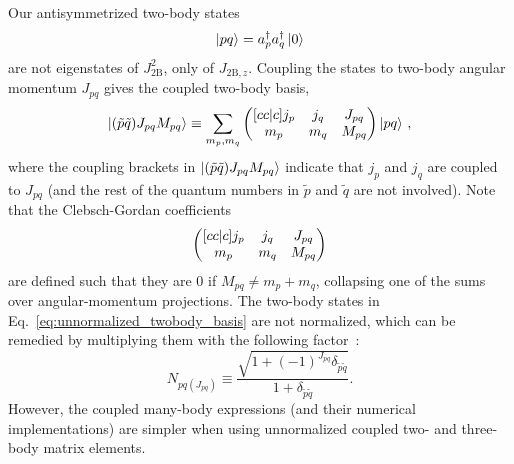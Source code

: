 Our antisymmetrized two-body states
\begin{equation}
  \ket{pq} = a_{p}^{\dagger} a_{q}^{\dagger} \ket{0}
\end{equation}
are not eigenstates of $J_{\text{2B}}^2$,
only of $J_{\text{2B},z}$.
Coupling the states to two-body angular momentum $J_{pq}$
gives the coupled two-body basis,
\begin{equation}\label{eq:unnormalized_twobody_basis}
  \ket{(\tilde{p} \tilde{q}) J_{pq} M_{pq}} \equiv
  \sum_{m_p, m_q}
  \begin{pmatrix}[cc|c] j_p & j_q & J_{pq} \\ m_p & m_q & M_{pq} \end{pmatrix}
  \ket{pq}
  \,,
\end{equation}
where the coupling brackets in $\ket{(\tilde{p} \tilde{q}) J_{pq} M_{pq}}$
indicate that $j_p$ and $j_q$ are coupled to $J_{pq}$
(and the rest of the quantum numbers in $\tilde{p}$ and $\tilde{q}$ are not involved).
Note that the Clebsch-Gordan coefficients
\begin{equation}
  \begin{pmatrix}[cc|c] j_p & j_q & J_{pq} \\ m_p & m_q & M_{pq} \end{pmatrix}
\end{equation}
are defined such that they are 0
if $M_{pq} \neq m_p + m_q$,
collapsing one of the sums over angular-momentum projections.
The two-body states in Eq.~\eqref{eq:unnormalized_twobody_basis}
are not normalized,
which can be remedied by multiplying them with the following factor~\cite{Suho07angmom}:
\begin{equation}
  N_{pq(J_{pq})} \equiv \frac{\sqrt{1 + (-1)^{J_{pq}}
      \delta_{\tilde{p} \tilde{q}}}}{1 + \delta_{\tilde{p} \tilde{q}}}.
\end{equation}
However, the coupled many-body expressions
(and their numerical implementations)
are simpler when using unnormalized coupled two- and three-body matrix elements.

